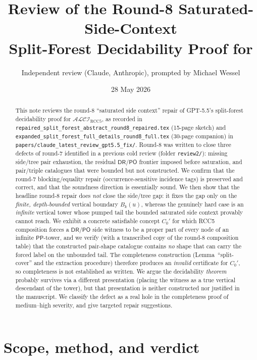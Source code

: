 \documentclass[11pt]{article}
\title{Review of the Round-8 Saturated-Side-Context\\
Split-Forest Decidability Proof for \texorpdfstring{\ALCIRCC}{ALCI-RCC5}}
\author{Independent review (Claude, Anthropic), prompted by Michael Wessel}
\date{28 May 2026}
\newcommand{\ALCIRCC}{\ensuremath{\mathcal{ALCI}_{\mathrm{RCC5}}}}
\newcommand{\DR}{\mathsf{DR}}
\newcommand{\PO}{\mathsf{PO}}
\newcommand{\PP}{\mathsf{PP}}
\begin{document}
\maketitle

\begin{abstract}
This note reviews the round-8 ``saturated side context'' repair of GPT-5.5's
split-forest decidability proof for \ALCIRCC, as recorded in
\texttt{repaired\_split\_forest\_abstract\_round8\_repaired.tex} (15-page sketch)
and \texttt{expanded\_split\_forest\_full\_details\_round8\_full.tex} (30-page
companion) in \texttt{papers/claude\_latest\_review\_gpt5.5\_fix/}.  Round-8 was
written to close three defects of round-7 identified in a previous cold review
(folder \texttt{review2/}): missing side/tree pair exhaustion, the residual
$\DR/\PO$ frontier imposed before saturation, and pair/triple catalogues that
were bounded but not constructed.  We confirm that the round-7
blocking/equality repair (occurrence-sensitive incidence tags) is preserved and
correct, and that the soundness direction is essentially sound.  We then show
that the headline round-8 repair does \emph{not} close the side/tree gap: it
fixes the gap only on the \emph{finite, depth-bounded} vertical boundary
$B_k(u)$, whereas the genuinely hard case is an \emph{infinite} vertical tower
whose pumped tail the bounded saturated side context provably cannot reach.  We
exhibit a concrete satisfiable concept $C_0'$ for which RCC5 composition forces
a $\DR/\PO$ side witness to be a proper part of every node of an infinite
$\PP$-tower, and we verify (with a transcribed copy of the round-8 composition
table) that the constructed pair-shape catalogue contains \emph{no} shape that
can carry the forced label on the unbounded tail. The completeness construction
(Lemma~``split-cover'' and the extraction procedure) therefore produces an
\emph{invalid} certificate for $C_0'$, so completeness is not established as
written.  We argue the decidability \emph{theorem} probably survives via a
different presentation (placing the witness as a true vertical descendant of the
tower), but that presentation is neither constructed nor justified in the
manuscript.  We classify the defect as a real hole in the completeness proof of
medium--high severity, and give targeted repair suggestions.
\end{abstract}

\tableofcontents

\section{Scope, method, and verdict}
\end{document}
